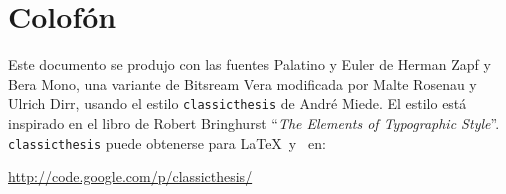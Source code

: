 \pagestyle{empty}

\hfill

\vfill


\section*{Colof\'on}
Este documento se produjo con las fuentes Palatino y Euler de Herman Zapf y Bera Mono, una variante de Bitsream Vera modificada por Malte Rosenau y Ulrich Dirr, usando el estilo \texttt{classicthesis} de Andr\'e Miede. 
El estilo está inspirado en el libro de Robert Bringhurst ``\emph{The Elements of Typographic Style}''. 
\texttt{classicthesis} puede obtenerse para \LaTeX\ y \mLyX\ en: 
\begin{center}
\url{http://code.google.com/p/classicthesis/}
\end{center}
